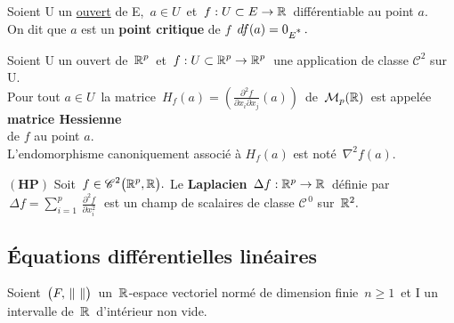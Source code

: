 \vspace{1.5cm}

Soient U un \underline{ouvert} de E, \(\,a\in U\,\) et \(\,f:U\subset E\to \mathbb{R}\,\) différentiable au point $a$.\vspace{0.1cm}\\
On dit que $a$ est un \textbf{point critique} de $f$ \ssi \(\,df(a)=0_{E\textsuperscript{*}}\,.\)

\vspace{1.5cm}

Soient U un ouvert de \(\displaystyle\,\mathbb{R}^p\,\) et \(\displaystyle\,f:U\subset \mathbb{R}^p\to \mathbb{R}^p\,\) une application de classe $\mathscr{C}^2$ sur U.\vspace{0.2cm}\\
Pour tout \(a\in U\,\) la matrice \(\,\displaystyle H_f(a)=\left(\frac{\partial^2\!f}{\partial x_i\partial x_j}(a)\!\right)\,\) de \(\,\mathcal{M}_p(\mathbb{R})\,\) est appelée \textbf{matrice Hessienne}\vspace{-0.1cm}\\
de $f$ au point $a$.\vspace{0.2cm}\\
L'endomorphisme canoniquement associé à $H_f(a)$ est noté \(\,\nabla ^2f(a).\)

\vspace{1.5cm}

\(\left(\mathbf{HP}\right)\) Soit \(\,\displaystyle f \in \mathscr{C}^2\bigl(\mathbb{R}^p,\mathbb{R}\bigr).\) Le \textbf{Laplacien} \(\,\Delta f:\mathbb{R}^p\to \mathbb{R}\,\) définie par \(\,\displaystyle \Delta f=\displaystyle\sum_{i=1}^p \,\frac{\partial^2\!f}{\partial x_i^2}\;\) est un champ de scalaires de classe $\mathscr{C}^{\,0}$ sur \(\,\mathbb{R}^2.\)

\newpage

\subsection{Équations différentielles linéaires}

\vspace{1cm}

\begin{center}
    Soient \(\,\bigl(F,\,\norm{\ }\bigr)\,\) un \(\,\mathbb{R}\)-espace vectoriel normé de dimension finie \(\,n\geq 1\,\) et I un intervalle de \(\,\mathbb{R}\,\) d'intérieur non vide.
\end{center}

\vspace{0.5cm}

